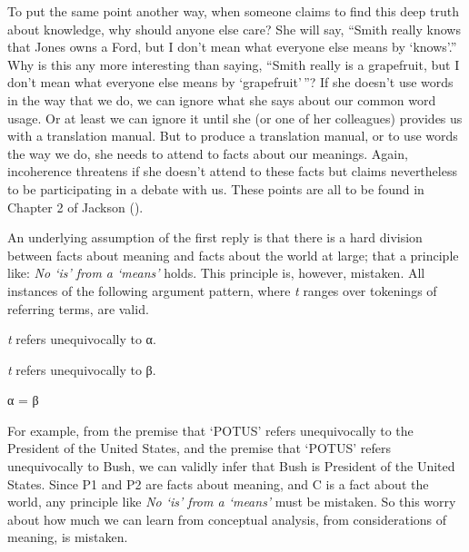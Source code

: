 \documentclass[
  10pt,
  letterpaper,
  DIV=11,
  numbers=noendperiod,
  twoside]{scrartcl}
\providecommand{\tightlist}{%
  \setlength{\itemsep}{0pt}\setlength{\parskip}{0pt}}\usepackage{longtable,booktabs,array}
\begin{document}
To put the same point another way, when someone claims to find this deep
truth about knowledge, why should anyone else care? She will say,
``Smith really knows that Jones owns a Ford, but I don't mean what
everyone else means by `knows'.'' Why is this any more interesting than
saying, ``Smith really is a grapefruit, but I don't mean what everyone
else means by `grapefruit'\,''? If she doesn't use words in the way that
we do, we can ignore what she says about our common word usage. Or at
least we can ignore it until she (or one of her colleagues) provides us
with a translation manual. But to produce a translation manual, or to
use words the way we do, she needs to attend to facts about our
meanings. Again, incoherence threatens if she doesn't attend to these
facts but claims nevertheless to be participating in a debate with us.
These points are all to be found in Chapter 2 of Jackson
().

An underlying assumption of the first reply is that there is a hard
division between facts about meaning and facts about the world at large;
that a principle like: \emph{No `is' from a `means'} holds. This
principle is, however, mistaken. All instances of the following argument
pattern, where \emph{t} ranges over tokenings of referring terms, are
valid.

\begin{description}
\tightlist
\item[P1.]
\emph{t} refers unequivocally to α.
\item[P2.]
\emph{t} refers unequivocally to β.
\item[C.]
α = β
\end{description}

For example, from the premise that `POTUS' refers unequivocally to the
President of the United States, and the premise that `POTUS' refers
unequivocally to Bush, we can validly infer that Bush is President of
the United States. Since P1 and P2 are facts about meaning, and C is a
fact about the world, any principle like \emph{No `is' from a `means'}
must be mistaken. So this worry about how much we can learn from
conceptual analysis, from considerations of meaning, is mistaken.
\end{document}
